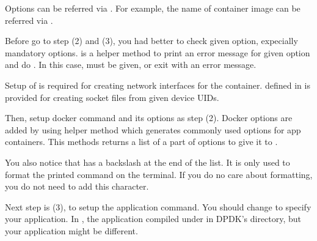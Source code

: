\documentclass[a4paper,11pt,openany,oneside,english]{sphinxmanual}
\begin{document}
Options can be referred via . For example, the name of container
image can be referred via .

Before go to step (2) and (3), you had better to check given option,
expecially mandatory options.
 is a helper method to print an error message
for given option and do . In this case,  must
be given, or exit with an error message.

Setup of  is required for creating network interfaces
for the container.  defined in  is
provided for creating socket files from given device UIDs.

Then, setup docker command and its options as step (2).
Docker options are added by using helper method
 which generates commonly used options for app
containers.
This methods returns a list of a part of options to give it to
.

\begin{sphinxVerbatim}[commandchars=\\\{\},formatcom=\footnotesize]
  \PYG{p}{[}   \PYG{p}{]}
   
\end{sphinxVerbatim}

You also notice that  has a backslash \sphinxcode{\sphinxupquote{\textbackslash{}\textbackslash{}}} at the end of
the list.
It is only used to format the printed command on the terminal.
If you do no care about formatting, you do not need to add this character.

Next step is (3), to setup the application command.
You should change  to specify your application.
In , the application compiled under  in DPDK’s
directory, but your application might be different.
\end{document}
